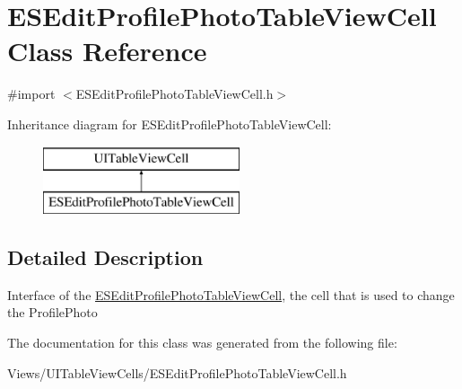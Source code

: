 \hypertarget{interface_e_s_edit_profile_photo_table_view_cell}{}\section{E\+S\+Edit\+Profile\+Photo\+Table\+View\+Cell Class Reference}
\label{interface_e_s_edit_profile_photo_table_view_cell}


{\ttfamily \#import $<$E\+S\+Edit\+Profile\+Photo\+Table\+View\+Cell.\+h$>$}

Inheritance diagram for E\+S\+Edit\+Profile\+Photo\+Table\+View\+Cell\+:\begin{figure}[H]
\begin{center}
\leavevmode
\includegraphics[height=2.000000cm]{interface_e_s_edit_profile_photo_table_view_cell}
\end{center}
\end{figure}


\subsection{Detailed Description}
Interface of the \hyperlink{interface_e_s_edit_profile_photo_table_view_cell}{E\+S\+Edit\+Profile\+Photo\+Table\+View\+Cell}, the cell that is used to change the Profile\+Photo 

The documentation for this class was generated from the following file\+:\begin{DoxyCompactItemize}
\item 
Views/\+U\+I\+Table\+View\+Cells/E\+S\+Edit\+Profile\+Photo\+Table\+View\+Cell.\+h\end{DoxyCompactItemize}
